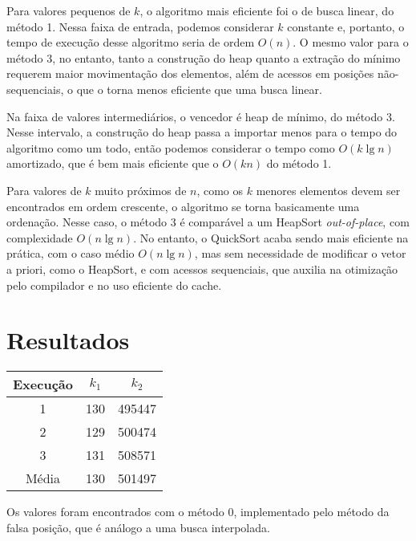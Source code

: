 Para valores pequenos de $k$, o algoritmo mais eficiente foi o de busca linear, do método 1. Nessa faixa de entrada, podemos considerar $k$ constante e, portanto, o tempo de execução desse algoritmo seria de ordem $O(n)$. O mesmo valor para o método 3, no entanto, tanto a construção do heap quanto a extração do mínimo requerem maior movimentação dos elementos, além de acessos em posições não-sequenciais, o que o torna menos eficiente que uma busca linear.

Na faixa de valores intermediários, o vencedor é heap de mínimo, do método 3. Nesse intervalo, a construção do heap passa a importar menos para o tempo do algoritmo como um todo, então podemos considerar o tempo como $O(k \lg n)$ amortizado, que é bem mais eficiente que o $O(k n)$ do método 1.

Para valores de $k$ muito próximos de $n$, como os $k$ menores elementos devem ser encontrados em ordem crescente, o algoritmo se torna basicamente uma ordenação. Nesse caso, o método 3 é comparável a um HeapSort \textit{out-of-place}, com complexidade $O(n \lg n)$. No entanto, o QuickSort acaba sendo mais eficiente na prática, com o caso médio $O(n \lg n)$, mas sem necessidade de modificar o vetor a priori, como o HeapSort, e com acessos sequenciais, que auxilia na otimização pelo compilador e no uso eficiente do cache.

\section{Resultados}

\begin{table}[H]
    \centering
    \begin{tabular}{ccc}
        \toprule
        Execução & $k_1$ & $k_2$ \\
        \midrule
        1 & 130 & 495447 \\
        2 & 129 & 500474 \\
        3 & 131 & 508571 \\
        \midrule
        Média & 130 & 501497 \\
        \bottomrule
    \end{tabular}
\end{table}

Os valores foram encontrados com o método 0, implementado pelo método da falsa posição, que é análogo a uma busca interpolada.
